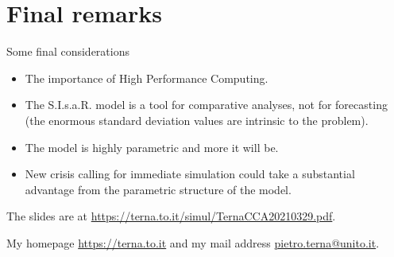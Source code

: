 \documentclass[8pt]{beamer}
\begin{document}
\section{Final remarks}

\begin{frame}{Some final considerations}

\begin{itemize}

\item
The importance of High Performance Computing.

\bigskip

\item The S.I.s.a.R. model is a tool for comparative analyses, not for forecasting (the enormous standard deviation values are intrinsic to the problem).


\item The model is highly parametric and more it will be.

\item New crisis calling for immediate simulation could take a substantial advantage from the parametric structure of the model.

\end{itemize}

 \bigskip
 The slides are at \url{https://terna.to.it/simul/TernaCCA20210329.pdf}.
 
 My homepage \url{https://terna.to.it} and my mail address \url{pietro.terna@unito.it}.
 
\end{frame}
\end{document}
